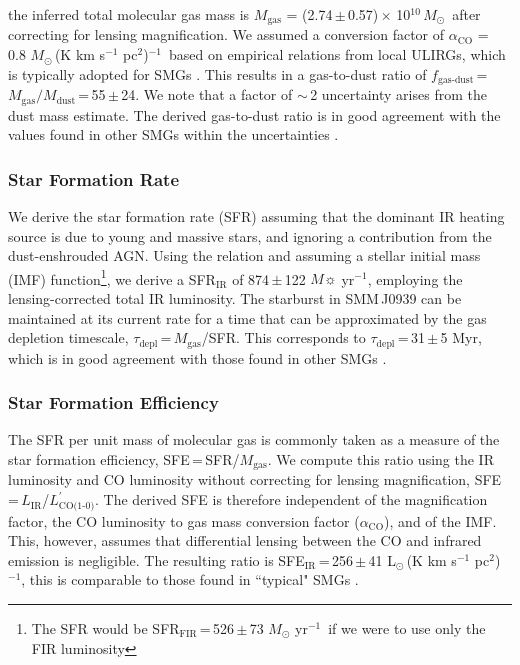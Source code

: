 \documentclass[iop]{emulateapj}
\newcommand{\Msun}{\mbox{$M_{\odot}$}}
\newcommand{\Lsun}{\mbox{L$_{\odot}$}}
\newcommand{\Lp}{\mbox{$L^{\prime}_\textrm{CO(1-0)}$}}
\newcommand{\LpU}{\mbox{K\,\,km\,\,s$^{-1}$\,\,pc$^2$}}
\newcommand{\eg}{{\sl e.g.,~}}
\newcommand{\pmOne}{\mbox{$^{-1}$}}
\begin{document}
the inferred total molecular gas mass is $M_\textrm{gas}$ = (2.74\,$\pm$\,0.57)\,$\times$\,\,10$^{10}$\,\Msun\, after correcting for lensing magnification. We assumed a conversion factor of $\alpha_\textrm{CO}$ = 0.8\,\,\Msun\,(\LpU)\pmOne\ based on empirical relations from local ULIRGs, which is typically
adopted for SMGs \citep[\eg][]{Tacconi06a,Tacconi08a,Bothwell13a}.
This results in a gas-to-dust
ratio of $f_\textrm{gas-dust}$\,=\,$M_\textrm{gas}/M_\textrm{dust}$\,=\,55\,$\pm$\,24. We note that a factor of $\sim$\,2 uncertainty arises from the dust mass estimate. The derived gas-to-dust ratio is in good agreement with the
values found in other SMGs within the uncertainties \citep{Coppin08a,Micha10a,Riechers11c}.

\subsubsection{Star Formation Rate}
We derive the star formation rate (SFR) assuming that the dominant IR heating source is due to young and massive stars, and ignoring a contribution from the
dust-enshrouded AGN.
Using the \citet{Kennicutt98a} relation and assuming a \citet{Chabrier03a}
stellar initial mass (IMF) function\footnote{The SFR would be SFR$_\textrm{FIR}$\,=\,526\,$\pm$\,73 $M_
\odot$ yr\pmOne\ if we were to use only the FIR luminosity},
we derive a SFR$_\textrm{IR}$ of 874\,$\pm$\,122 $M\sun$\,\,yr\pmOne, employing the lensing-corrected total IR luminosity.
The starburst in SMM\,J0939 can be maintained at its
current rate for a time that can be approximated by the gas depletion timescale, $\tau_\textrm{depl}$\,=\,$M_\textrm{gas}$/SFR.
This corresponds to $\tau_\textrm{depl}$\,=\,31\,$\pm$\,5 Myr, which is in good agreement with those found in other SMGs \citep[\eg][]{Greve05a}.

\subsubsection{Star Formation Efficiency}
The SFR per unit mass of molecular gas is commonly taken as a
measure of the star formation efficiency, SFE\,=\,SFR/$M_\textrm{gas}$. We compute this ratio using the IR
luminosity and CO luminosity without correcting for lensing magnification, SFE\,=\,$L_\textrm{IR}$/\Lp. The derived SFE is therefore independent of the magnification factor, the CO luminosity to gas mass conversion factor ($\alpha_\textrm{CO}$), and of the
IMF. This, however, assumes that differential lensing between the CO and infrared emission is negligible.
The resulting ratio is SFE$_\textrm{IR}$\,=\,256\,$\pm$\,41\,\,\Lsun\,(\LpU)$^{-1}$, this is comparable
to those found in ``typical" SMGs \citep{Greve05a,Tacconi06a,Riechers11c}.
\end{document}
